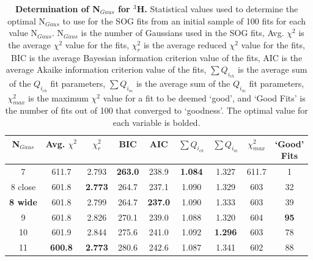 \vspace{6mm}
\begin{table}[!h]
\centering
\begin{tabular}{|c c c c c c c c c|}
\hline
\textbf{N$_{Gaus}$} & \textbf{Avg. $\chi^2$} & \textbf{$\chi^2_r$} & \textbf{BIC} & \textbf{AIC} & \textbf{$\sum Q_{i_{ch}}$} & \textbf{$\sum Q_{i_{m}}$} & \textbf{$\chi^2_{max}$} & \makecell{\textbf{`Good'}\\ \textbf{Fits}} \\
\hline
7 & 611.7 & 2.793 & \textbf{263.0} & 238.9 & \textbf{1.084} & 1.327 & 611.7 & 1\\
8 close & 601.8 & \textbf{2.773} & 264.7 & 237.1 & 1.090 & 1.329 & 603 & 32\\
\textbf{8 wide} & 601.8 & 2.799 & 264.7 & \textbf{237.0} & 1.090 & 1.333 & 603 & 39\\
9 & 601.8 & 2.826 & 270.1 & 239.0 & 1.088 & 1.320 & 604 & \textbf{95}\\
10 & 601.9 & 2.844 & 275.6 & 241.0 & 1.092 & \textbf{1.296} & 603 & 78\\
11 & \textbf{600.8} & \textbf{2.773} & 280.6 & 242.6 & 1.087 & 1.341 & 602 & 88\\
\hline
\end{tabular}
\caption[Determination of N$_{Gaus}$ for $^3$H]{{\bf{Determination of N$_{Gaus}$ for $^3$H.}} Statistical values used to determine the optimal N$_{Gaus}$ to use for the SOG fits from an initial sample of 100 fits for each value N$_{Gaus}$. N$_{Gaus}$ is the number of Gaussians used in the SOG fits, Avg. $\chi^2$ is the average $\chi^2$ value for the fits, $\chi^2_r$ is the average reduced $\chi^2$ value for the fits, BIC is the average Bayesian information criterion value of the fits, AIC is the average Akaike information criterion value of the fits, $\sum Q_{i_{ch}}$ is the average sum of the $Q_{i_{ch}}$ fit parameters, $\sum Q_{i_{m}}$ is the average sum of the $Q_{i_{m}}$ fit parameters, $\chi^2_{max}$ is the maximum $\chi^2$ value for a fit to be deemed `good', and `Good Fits' is the number of fits out of 100 that converged to `goodness'. The optimal value for each variable is bolded.}
\label{tab:3h_ngaus}
\end{table}

